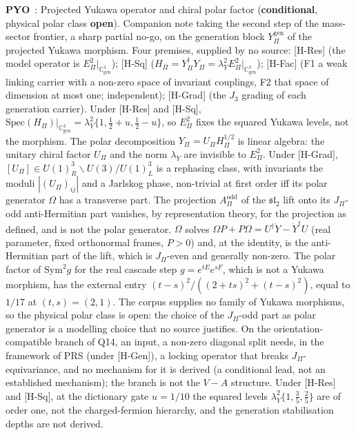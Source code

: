 \documentclass[11pt,a4paper]{article}
\newcommand{\sopen}{\textcolor{copen}{\textbf{open}}}
\newcommand{\scond}{\textcolor{ccond}{\textbf{conditional}}}
\begin{document}
    \textbf{PYO}~\cite{Beau2026pyo}: Projected Yukawa operator and chiral polar factor (\scond, physical polar class
    \sopen).
    Companion note taking the second step of the mass-sector frontier, a sharp partial no-go, on the generation block
    $Y^{\mathrm{gen}}_\Pi$ of the projected Yukawa morphism.
    Four premises, supplied by no source: [H-Res] (the model operator is $E_\Pi^2|_{\mathbb{C}^3_{\mathrm{gen}}}$);
    [H-Sq] ($H_\Pi = Y_\Pi^\dagger Y_\Pi = \lambda_Y^2 E_\Pi^2|_{\mathbb{C}^3_{\mathrm{gen}}}$); [H-Fac] (F1 a weak
    linking carrier with a non-zero space of invariant couplings, F2 that space of dimension at most one;
    independent); [H-Grad] (the $J_3$ grading of each generation carrier).
    Under [H-Res] and [H-Sq], $\mathrm{Spec}(H_\Pi)|_{\mathbb{C}^3_{\mathrm{gen}}} =
    \lambda_Y^2\{1, \tfrac12 + u, \tfrac12 - u\}$, so $E_\Pi^2$ fixes the squared Yukawa levels, not the morphism.
    The polar decomposition $Y_\Pi = U_\Pi H_\Pi^{1/2}$ is linear algebra: the unitary chiral factor $U_\Pi$ and the
    norm $\lambda_Y$ are invisible to $E_\Pi^2$.
    Under [H-Grad], $[U_\Pi] \in U(1)^3_R \backslash U(3) / U(1)^3_L$ is a rephasing class, with invariants the moduli
    $|(U_\Pi)_{ij}|$ and a Jarlskog phase, non-trivial at first order iff its polar generator $\Omega$ has a
    transverse part.
    The projection $A_\Pi^{\mathrm{odd}}$ of the $\mathfrak{sl}_2$ lift onto its $J_\Pi$-odd anti-Hermitian part
    vanishes, by representation theory, for the projection as defined, and is not the polar generator.
    $\Omega$ solves $\Omega P + P\Omega = U^\dagger \dot Y - \dot Y^\dagger U$
    (real parameter, fixed orthonormal frames, $P > 0$) and,
    at the identity, is the anti-Hermitian part of the lift, which is $J_\Pi$-even and generally non-zero.
    The polar factor of $\mathrm{Sym}^2 g$ for the real cascade step $g = e^{tE}e^{sF}$, which is not a Yukawa
    morphism, has the external entry $(t-s)^2/((2+ts)^2+(t-s)^2)$, equal to $1/17$ at $(t,s) = (2,1)$.
    The corpus supplies no family of Yukawa morphisms, so the physical polar class is open: the choice of the
    $J_\Pi$-odd part as polar generator is a modelling choice that no source justifies.
    On the orientation-compatible branch of Q14, an input, a non-zero diagonal split needs, in the framework of PRS
    (under [H-Gen]), a locking operator that breaks $J_\Pi$-equivariance, and no mechanism for it is derived (a
    conditional lead, not an established mechanism); the branch is not the $V{-}A$ structure.
    Under [H-Res] and [H-Sq], at the dictionary gate $u = 1/10$ the squared levels
    $\lambda_Y^2\{1, \tfrac35, \tfrac25\}$ are of order one, not the charged-fermion hierarchy, and the generation
    stabilisation depths are not derived.
\end{document}
